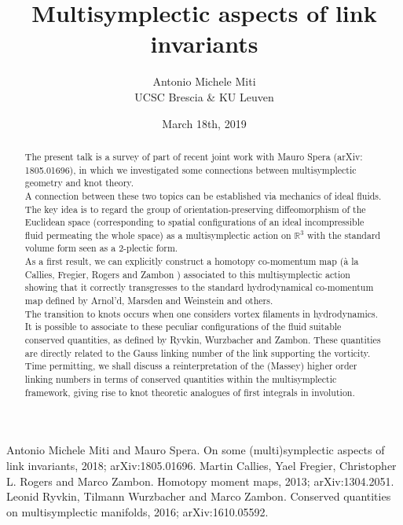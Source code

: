 \documentclass[11pt,a4paper,twoside]{article}
\begin{document}
\title{Multisymplectic aspects of link invariants}
\author{Antonio Michele Miti\\ UCSC Brescia \& KU Leuven}

\date{March 18th, 2019}
\maketitle


\begin{abstract}

The present talk is a survey of part of recent joint work with Mauro Spera\cite{firsticle} (arXiv: 1805.01696), in which we investigated some connections between multisymplectic geometry and knot theory.
\\
A connection between these two topics can be established via mechanics of ideal fluids.
The key idea is to regard the group of orientation-preserving diffeomorphism of the Euclidean space (corresponding to spatial configurations of an ideal incompressible fluid permeating the whole space) as a multisymplectic action on $\mathbb{R}^3$ with the standard volume form seen as a 2-plectic form.
\\
As a first result, we can explicitly construct a homotopy co-momentum map (à la Callies,  Fregier, Rogers and Zambon \cite{CFRZ}) associated to this multisymplectic action showing that it correctly transgresses to the standard hydrodynamical co-momentum map defined by Arnol’d, Marsden and Weinstein and others.
\\
The transition to knots occurs when one considers vortex filaments in hydrodynamics.
It is possible to associate to these peculiar configurations of the fluid suitable conserved quantities, as defined by Ryvkin, Wurzbacher and Zambon\cite{RWZ}. 
These quantities are directly related to the Gauss linking number of the link supporting the vorticity.
\\
Time permitting, we shall discuss a reinterpretation of the (Massey) higher order linking numbers in terms of conserved quantities within the \cite{RWZ} multisymplectic framework, giving rise to knot theoretic analogues  of first integrals in involution.
 
\end{abstract}




\begin{thebibliography}{9}
		Antonio Michele Miti and Mauro Spera.
		\newblock On some (multi)symplectic aspects of link invariants, 2018;
		\newblock arXiv:1805.01696.
		Martin Callies, Yael Fregier, Christopher L. Rogers and Marco Zambon.
		\newblock Homotopy moment maps, 2013;
		\newblock arXiv:1304.2051.
		Leonid Ryvkin, Tilmann Wurzbacher and Marco Zambon.
		\newblock Conserved quantities on multisymplectic manifolds, 2016;
		\newblock arXiv:1610.05592.

\end{thebibliography}
\end{document}
